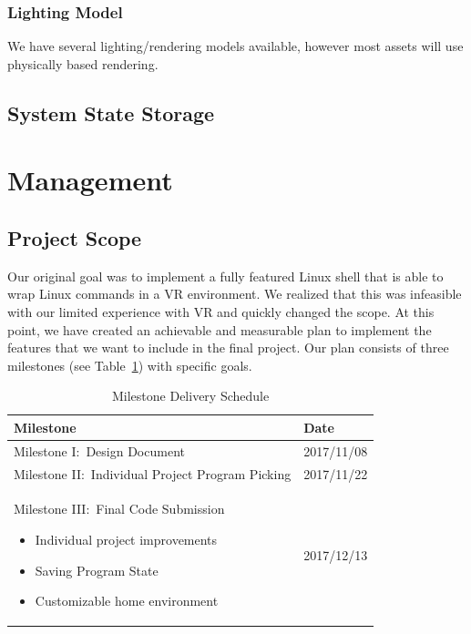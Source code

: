 \documentclass[titlepage,12pt]{article}
\begin{document}
\subsubsection{Lighting Model} We have several lighting/rendering models
available, however most assets will use physically based rendering.

\subsection{System State Storage}\label{sec:state}

\section{Management}

\subsection{Project Scope}
Our original goal was to implement a fully featured Linux shell that is able to
wrap Linux commands in a VR environment. We realized that this was infeasible
with our limited experience with VR and quickly changed the scope. At this
point, we have created an achievable and measurable plan to implement the
features that we want to include in the final project. Our plan consists of
three milestones (see Table~\ref{tab:milestones}) with specific goals.

\begin{table}[H]
    \caption{Milestone Delivery Schedule}\label{tab:milestones}
    \centering
    \begin{tabular}{|p{10cm}|l|}
        \hline
        \textbf{Milestone} & \textbf{Date} \\
        \hline\hline
        Milestone I:\ Design Document & 2017/11/08 \\
        \hline
        Milestone II:\ Individual Project Program Picking & 2017/11/22 \\
        \hline
        Milestone III:\ Final Code Submission
        \begin{itemize}
            \item Individual project improvements
            \item Saving Program State
            \item Customizable home environment
        \end{itemize} & 2017/12/13\\
        \hline
    \end{tabular}
\end{table}
\end{document}
